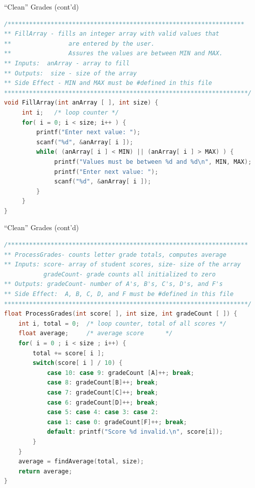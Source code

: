 \documentclass[graphics]{beamer}
\begin{document}
\begin{frame}[fragile]{``Clean'' Grades (cont'd)}
    \begin{lstlisting}[language=C,basicstyle=\scriptsize,keywordstyle=\color{blue},commentstyle=\color{green},showstringspaces=false,stringstyle=\color{red}]
/******************************************************************
** FillArray - fills an integer array with valid values that
**                are entered by the user.  
**                Assures the values are between MIN and MAX.
** Inputs:  anArray - array to fill
** Outputs:  size - size of the array
** Side Effect - MIN and MAX must be #defined in this file
********************************************************************/
void FillArray(int anArray [ ], int size) {
     int i;   /* loop counter */
     for( i = 0; i < size; i++ ) {
         printf("Enter next value: ");
         scanf("%d", &anArray[ i ]);
         while( (anArray[ i ] < MIN) || (anArray[ i ] > MAX) ) {
              printf("Values must be between %d and %d\n", MIN, MAX);
              printf("Enter next value: ");
              scanf("%d", &anArray[ i ]);
         }
     }
}
    \end{lstlisting}
\end{frame}

\begin{frame}[fragile]{``Clean'' Grades (cont'd)}
    \begin{lstlisting}[language=C,basicstyle=\scriptsize,keywordstyle=\color{blue},commentstyle=\color{green},showstringspaces=false,stringstyle=\color{red}]
/*******************************************************************
** ProcessGrades- counts letter grade totals, computes average
** Inputs: score- array of student scores, size- size of the array
           gradeCount- grade counts all initialized to zero
** Outputs: gradeCount- number of A's, B's, C's, D's, and F's
** Side Effect:  A, B, C, D, and F must be #defined in this file
********************************************************************/
float ProcessGrades(int score[ ], int size, int gradeCount [ ]) {
    int i, total = 0;  /* loop counter, total of all scores */
    float average;     /* average score      */
    for( i = 0 ; i < size ; i++) {
        total += score[ i ];
        switch(score[ i ] / 10) {
            case 10: case 9: gradeCount [A]++; break;
            case 8: gradeCount[B]++; break;
            case 7: gradeCount[C]++; break;
            case 6: gradeCount[D]++; break;
            case 5: case 4: case 3: case 2:
            case 1: case 0: gradeCount[F]++; break;
            default: printf("Score %d invalid.\n", score[i]);
        }
    }
    average = findAverage(total, size);
    return average;
}
    \end{lstlisting}
\end{frame}
\end{document}
